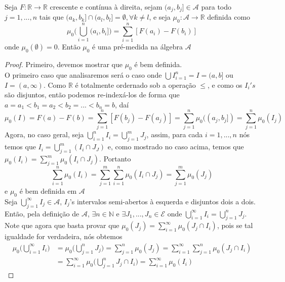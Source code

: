 \begin{proposicao} \label{prop3.3}
    Seja $F: \mathbb{R} \longrightarrow \mathbb{R}$ crescente e contínua à direita, sejam $(a_j,b_j] \in \mathcal{A}$ para todo $j=1,...,n$ tais que $(a_k,b_k] \cap (a_l,b_l] = \emptyset, \forall k \neq l$, e seja $\mu_0: \mathcal{A} \longrightarrow \mathbb{R}$ definida como 
    \[
    \mu_0 \bigg( \bigcup _{i=1} ^n (a_i,b_i] \bigg) = \sum _{i=1} ^n [F(a_i)-F(b_i)]    
    \] 
    onde $\mu_0(\emptyset)=0$. Então $\mu_0$ é uma pré-medida na álgebra $\mathcal{A}$

    \begin{proof}
        Primeiro, devemos mostrar que $\mu_0$ é bem definida. \\
        O primeiro caso que analisaremos será o caso onde $\bigcup I_{i=1} ^n = I = (a,b]$ ou $I = (a,\infty)$. Como $\mathbb{R}$ é totalmente ordernado sob a operação $\leq$, e como os $I_i's$ são disjuntos, então podemos re-indexá-los de forma que $a=a_1 < b_1 = a_2 < b_2 = ... < b_n = b$, daí 
        \[
        \mu_0(I)=F(a)-F(b)=\sum _{j=1} ^n [F(b_{j})- F(a_{j})] = \sum _{j=1} ^n \mu_0((a_j,b_j]) = \sum _{j=1} ^n \mu_0(I_j)   
        \] 
        Agora, no caso geral, seja $\bigcup _{i=1} ^n I_i = \bigcup _{j=1} ^m J_j$, assim, para cada $i = 1, ..., n$ nós temos que $I_i = \bigcup_{j=1} ^m (I_i \cap J_J)$ e, como mostrado no caso acima, temos que $\mu_0(I_i) = \sum_{j=1}^m \mu_0(I_i \cap J_j)$. Portanto 
        \[
        \sum_{i=1}^n \mu_0(I_i) = \sum_{j=1}^m \sum_{i=1}^n \mu_0(I_i \cap J_j) = \sum_{j=1}^m \mu_0(J_j) 
        \]
        e $\mu_0$ é bem definida em $\mathcal{A}$ \\
        Seja $\bigcup _{j=1} ^\infty I_j \in \mathcal{A}$, $I_j$'s intervalos semi-abertos à esquerda e disjuntos dois a dois. Então, pela definição de $\mathcal{A}$, $\exists n \in \mathbb{N}$ e $\exists J_1,...,J_n \in \mathcal{E}$ onde $\bigcup _{i=1} ^\infty I_i = \bigcup _{j=1} ^n J_j$. Note que agora que basta provar que $\mu_0(J_j)=\sum_{i=1} ^{\infty} \mu_0(J_j \cap I_i)$, pois se tal igualdade for verdadeira, nós obtemos
        \begin{align*}
            \mu_0 \bigg(\bigcup_{i=1} ^\infty I_i \bigg) &= \mu_0 \bigg(\bigcup_{j=1} ^n J_j \bigg) = \sum _{j=1} ^ n \mu_0 (J_j) = \sum _{i=1} ^ \infty \sum _{j=1} ^ n \mu_0 (J_j \cap I_i) \\ 
            &= \sum _{i=1} ^\infty \mu_0 \bigg( \bigcup_{j=1} ^n J_j \cap I_i \bigg) = \sum _{i=1} ^\infty \mu_0 (I_i)
        \end{align*}

\end{proof}
\end{proposicao}
